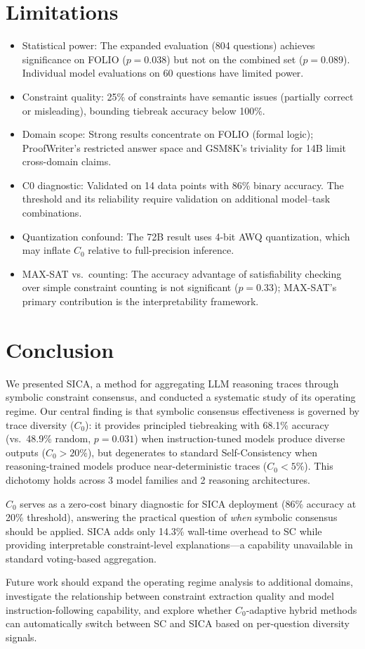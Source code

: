 \documentclass[11pt,a4paper]{article}
\begin{document}
\section{Limitations}

\begin{itemize}
\item Statistical power: The expanded evaluation (804 questions) achieves significance on FOLIO ($p=0.038$) but not on the combined set ($p=0.089$). Individual model evaluations on 60 questions have limited power.
\item Constraint quality: 25\% of constraints have semantic issues (partially correct or misleading), bounding tiebreak accuracy below 100\%.
\item Domain scope: Strong results concentrate on FOLIO (formal logic); ProofWriter's restricted answer space and GSM8K's triviality for 14B limit cross-domain claims.
\item C0 diagnostic: Validated on 14 data points with 86\% binary accuracy. The threshold and its reliability require validation on additional model--task combinations.
\item Quantization confound: The 72B result uses 4-bit AWQ quantization, which may inflate $C_0$ relative to full-precision inference.
\item MAX-SAT vs.\ counting: The accuracy advantage of satisfiability checking over simple constraint counting is not significant ($p=0.33$); MAX-SAT's primary contribution is the interpretability framework.
\end{itemize}

\section{Conclusion}

We presented SICA, a method for aggregating LLM reasoning traces through symbolic constraint consensus, and conducted a systematic study of its operating regime. Our central finding is that symbolic consensus effectiveness is governed by trace diversity ($C_0$): it provides principled tiebreaking with 68.1\% accuracy (vs.\ 48.9\% random, $p=0.031$) when instruction-tuned models produce diverse outputs ($C_0 > 20\%$), but degenerates to standard Self-Consistency when reasoning-trained models produce near-deterministic traces ($C_0 < 5\%$). This dichotomy holds across 3 model families and 2 reasoning architectures.

$C_0$ serves as a zero-cost binary diagnostic for SICA deployment (86\% accuracy at 20\% threshold), answering the practical question of \emph{when} symbolic consensus should be applied. SICA adds only 14.3\% wall-time overhead to SC while providing interpretable constraint-level explanations---a capability unavailable in standard voting-based aggregation.

Future work should expand the operating regime analysis to additional domains, investigate the relationship between constraint extraction quality and model instruction-following capability, and explore whether $C_0$-adaptive hybrid methods can automatically switch between SC and SICA based on per-question diversity signals.


\end{document}
